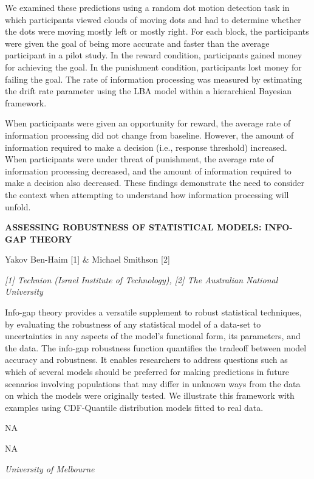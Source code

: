 \documentclass[]{article}
\begin{document}
We examined these predictions using a random dot motion detection task
in which participants viewed clouds of moving dots and had to determine
whether the dots were moving mostly left or mostly right. For each
block, the participants were given the goal of being more accurate and
faster than the average participant in a pilot study. In the reward
condition, participants gained money for achieving the goal. In the
punishment condition, participants lost money for failing the goal. The
rate of information processing was measured by estimating the drift rate
parameter using the LBA model within a hierarchical Bayesian framework.

When participants were given an opportunity for reward, the average rate
of information processing did not change from baseline. However, the
amount of information required to make a decision (i.e., response
threshold) increased. When participants were under threat of punishment,
the average rate of information processing decreased, and the amount of
information required to make a decision also decreased. These findings
demonstrate the need to consider the context when attempting to
understand how information processing will unfold.

\textbf{ASSESSING ROBUSTNESS OF STATISTICAL MODELS: INFO-GAP THEORY}

Yakov Ben-Haim {[}1{]} \& Michael Smithson {[}2{]}

\emph{{[}1{]} Technion (Israel Institute of Technology), {[}2{]} The
Australian National University}

Info-gap theory provides a versatile supplement to robust statistical
techniques, by evaluating the robustness of any statistical model of a
data-set to uncertainties in any aspects of the model's functional form,
its parameters, and the data. The info-gap robustness function
quantifies the tradeoff between model accuracy and robustness. It
enables researchers to address questions such as which of several models
should be preferred for making predictions in future scenarios involving
populations that may differ in unknown ways from the data on which the
models were originally tested. We illustrate this framework with
examples using CDF-Quantile distribution models fitted to real data.

NA

NA

\emph{University of Melbourne}
\end{document}
